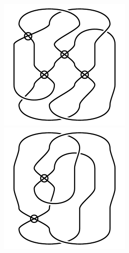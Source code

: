 \begin{figure}[H]
\begin{minipage}[b]{.18\linewidth}
\end{minipage}
\begin{minipage}[b]{.18\linewidth}
\centering
\includegraphics[width=\linewidth]{../data/virtual_4_34.png}
\end{minipage}
\begin{minipage}[b]{.18\linewidth}
\centering
\includegraphics[width=\linewidth]{../data/virtual_4_35.png}

\end{minipage}
\end{figure}
